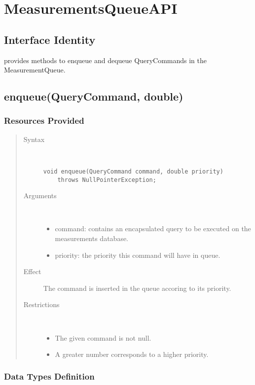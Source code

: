 \section{MeasurementsQueueAPI}

\subsection{Interface Identity}

\npar {} provides methods to enqueue and dequeue
QueryCommands in the MeasurementQueue.

\subsection{enqueue(QueryCommand, double)}

\subsubsection{Resources Provided}

\begin{quote}
	\begin{description}
		\item[Syntax] \ 
		\begin{verbatim}
void enqueue(QueryCommand command, double priority) 
    throws NullPointerException;
		\end{verbatim}
		\item[Arguments] \
		\begin{itemize}
			\item command: contains an encapsulated query to be executed on the
			measurements database.
			\item priority: the priority this command will have in queue. 
		\end{itemize}
		\item[Effect] The command is inserted in the queue accoring to its priority.
		\item[Restrictions] \ 
		\begin{itemize}
			\item The given command is not null.
			\item A greater number corresponds to a higher priority. 
		\end{itemize}
	\end{description} 
\end{quote}

\subsubsection{Data Types Definition}

